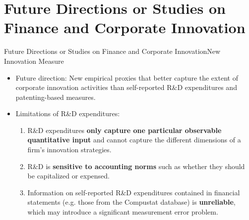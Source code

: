 \documentclass{beamer}
\begin{document}
    \section[Future Directions]{Future Directions or Studies on Finance and Corporate Innovation}

    \begin{frame}{Future Directions or Studies on Finance and Corporate Innovation}{New Innovation Measure}
        \vspace{-0.5cm}
        \begin{itemize}
            \item Future direction: New empirical proxies that better capture the extent of corporate innovation activities than self-reported R\&D expenditures and patenting-based measures.
            \item Limitations of R\&D expenditures:
            \begin{enumerate}
                \item R\&D expenditures \textbf{only capture one particular observable quantitative input} and cannot capture the different dimensions of a firm's innovation strategies.
                \item R\&D is \textbf{sensitive to accounting norms} such as whether they should be capitalized or expensed.
                \item Information on self-reported R\&D expenditures contained in financial statements (e.g. those from the Compustat database) is \textbf{unreliable}, which may introduce a significant measurement error problem.
            \end{enumerate}
        \end{itemize}
    \end{frame}
\end{document}
